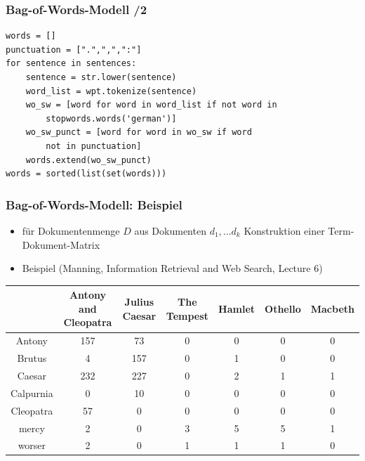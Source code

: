 
\begin{frame}[fragile]
    \frametitle{Bag-of-Words-Modell /2}
     
    \begin{verbatim}
words = []
punctuation = [".",",",":"]
for sentence in sentences:
    sentence = str.lower(sentence)
    word_list = wpt.tokenize(sentence)
    wo_sw = [word for word in word_list if not word in 
        stopwords.words('german')]
    wo_sw_punct = [word for word in wo_sw if word
        not in punctuation]
    words.extend(wo_sw_punct)          
words = sorted(list(set(words)))
    \end{verbatim}
\end{frame}
    
 

\begin{frame}[fragile]
    \frametitle{Bag-of-Words-Modell: Beispiel}

    \begin{itemize}
    \item für Dokumentenmenge $D$ aus Dokumenten $d_1, \dots d_k$ Konstruktion einer Term-Dokument-Matrix
    \item Beispiel (Manning, Information Retrieval and Web Search, Lecture 6)
    \end{itemize}
{\tiny
    \begin{tabular}{ccccccc}
    & Antony and Cleopatra & Julius Caesar & The Tempest & Hamlet & Othello & Macbeth \\
    \hline
    Antony &157&73&0&0&0&0 \\
Brutus&4&157&0&1&0&0\\
Caesar&232&227&0&2&1&1 \\
Calpurnia&0&10&0&0&0&0\\
Cleopatra&57&0&0&0&0&0\\
mercy&2&0&3&5&5&1\\
worser&2&0&1&1&1&0
    \end{tabular}}
\end{frame}

 

